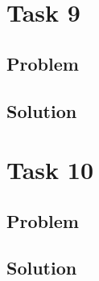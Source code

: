\documentclass[a4paper, 10pt]{article}
\begin{document}
	\section{Task 9}
	
		\subsection{Problem}
		
		\subsection{Solution}
	
	\section{Task 10}
	
		\subsection{Problem}
		
		\subsection{Solution}
\end{document}
